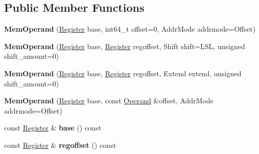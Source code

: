 \subsection*{Public Member Functions}
\begin{DoxyCompactItemize}
\item 
{\bfseries Mem\+Operand} (\hyperlink{structv8_1_1internal_1_1_register}{Register} base, int64\+\_\+t offset=0, Addr\+Mode addrmode=Offset)\hypertarget{classv8_1_1internal_1_1_mem_operand_ae9fd00bb795a6167aad166523c3638cd}{}\label{classv8_1_1internal_1_1_mem_operand_ae9fd00bb795a6167aad166523c3638cd}

\item 
{\bfseries Mem\+Operand} (\hyperlink{structv8_1_1internal_1_1_register}{Register} base, \hyperlink{structv8_1_1internal_1_1_register}{Register} regoffset, Shift shift=L\+SL, unsigned shift\+\_\+amount=0)\hypertarget{classv8_1_1internal_1_1_mem_operand_a562e2fbd4b0504f796639ef844aa1e50}{}\label{classv8_1_1internal_1_1_mem_operand_a562e2fbd4b0504f796639ef844aa1e50}

\item 
{\bfseries Mem\+Operand} (\hyperlink{structv8_1_1internal_1_1_register}{Register} base, \hyperlink{structv8_1_1internal_1_1_register}{Register} regoffset, Extend extend, unsigned shift\+\_\+amount=0)\hypertarget{classv8_1_1internal_1_1_mem_operand_a55149be1fde3109b1c4cbdd7b7dfa288}{}\label{classv8_1_1internal_1_1_mem_operand_a55149be1fde3109b1c4cbdd7b7dfa288}

\item 
{\bfseries Mem\+Operand} (\hyperlink{structv8_1_1internal_1_1_register}{Register} base, const \hyperlink{classv8_1_1internal_1_1_operand}{Operand} \&offset, Addr\+Mode addrmode=Offset)\hypertarget{classv8_1_1internal_1_1_mem_operand_a4fbd893ed38c7cf0c5516997eecefd20}{}\label{classv8_1_1internal_1_1_mem_operand_a4fbd893ed38c7cf0c5516997eecefd20}

\item 
const \hyperlink{structv8_1_1internal_1_1_register}{Register} \& {\bfseries base} () const \hypertarget{classv8_1_1internal_1_1_mem_operand_a31607a4294f4c498a8e2b3934f2d8c68}{}\label{classv8_1_1internal_1_1_mem_operand_a31607a4294f4c498a8e2b3934f2d8c68}

\item 
const \hyperlink{structv8_1_1internal_1_1_register}{Register} \& {\bfseries regoffset} () const \hypertarget{classv8_1_1internal_1_1_mem_operand_aa53f4b0548b9fcfce65ea6408d15ac04}{}\label{classv8_1_1internal_1_1_mem_operand_aa53f4b0548b9fcfce65ea6408d15ac04}


\end{DoxyCompactItemize}
